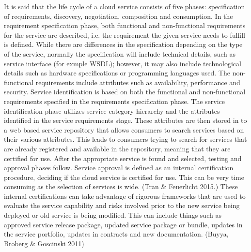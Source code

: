 \documentclass{article}
\begin{document}
It is said that the life cycle of a cloud service consists of five phases: specification of requirements, discovery, negotiation, composition and consumption. In the requirement specification phase, both functional and non-functional requirements for the service are described, i.e. the requirement the given service needs to fulfill is defined. While there are differences in the specification depending on the type of the service, normally the specification will include technical details, such as service interface (for exmple WSDL); however, it may also include technological details such as hardware specifications or programming languages used. The non-functional requirements include attributes such as availability, performance and security. Service identification is based on both the functional and non-functional requirements specified in the requirements specification phase. The service identification phase utilizes service category hierarchy and the attributes identified in the service requirements stage. These attributes are then stored in to a web based service repository that allows consumers to search services based on their various attributes. This leads to consumers trying to search for services that are already registered and available in the repository, meaning that they are certified for use. After the appropriate service is found and selected, testing and approval phases follow. Service approval is defined as an internal certification procedure, deciding if the cloud service is certified for use. This can be very time consuming as the selection of services is wide. (Tran \& Feuerlicht 2015.) These internal certifications can take advantage of rigorous frameworks that are used to evaluate the service capability and risks involved prior to the new service being deployed or old service is being modified. This can include things such as approved service release package, updated service package or bundle, updates in the service portfolio, updates in contracts and new documentation. (Buyya, Broberg \& Goscinski 2011) 
\par
\end{document}
